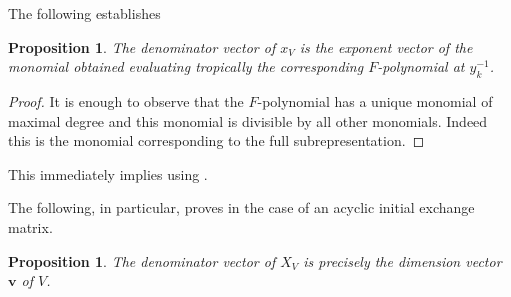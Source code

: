 \documentclass[12pt]{amsart}
\newtheorem{proposition}[theorem]{Proposition}
\newcommand{\bfv}{\mathbf{v}}
\begin{document}
  The following establishes \cite[Conjecture 7.17]{fomin-zelevinsky4}
  \begin{proposition}
    The denominator vector of $x_V$ is the exponent vector of the monomial obtained evaluating tropically the corresponding $F$-polynomial at $y_k^{-1}$.
  \end{proposition}
  \begin{proof}
    It is enough to observe that the $F$-polynomial has a unique monomial of maximal degree and this monomial is divisible by all other monomials.
    Indeed this is the monomial corresponding to the full subrepresentation.
  \end{proof}
  This immediately implies \cite[Conj. 6.11]{fomin-zelevinsky4} using \cite[Prop. 7.16]{fomin-zelevinsky4}.  
   

  The following, in particular, proves \cite[Conj. 2.9]{reading-stella} in the case of an acyclic initial exchange matrix.
   \begin{proposition}
    \label{prop:denominators}
    The denominator vector of $X_V$ is precisely the dimension vector $\bfv$ of $V$.
  \end{proposition}
\end{document}
